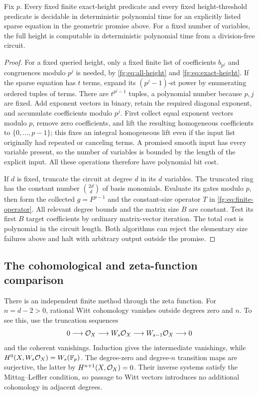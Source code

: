 \begin{corollary}
\label{fg:cor:elementary-p}
Fix $p$. Every fixed finite exact-height predicate and every fixed
height-threshold predicate is decidable in deterministic polynomial time
for an explicitly listed sparse equation in the geometric promise above.
For a fixed number of variables, the full height is computable in
deterministic polynomial time from a division-free circuit.
\end{corollary}
\begin{proof}
For a fixed queried height, only a fixed finite list of coefficients
$b_{p^j}$ and congruences modulo $p^j$ is needed, by
\eqref{fg:eq:all-height} and \eqref{fg:eq:exact-height}. If the sparse
equation has $t$ terms, expand its $(p^j-1)$-st power by enumerating
ordered tuples of terms. There are $t^{p^j-1}$ tuples, a polynomial
number because $p,j$ are fixed. Add exponent vectors in binary, retain
the required diagonal exponent, and accumulate coefficients modulo
$p^j$. First collect equal exponent vectors modulo $p$, remove zero
coefficients, and lift the resulting homogeneous coefficients to
$\{0,\ldots,p-1\}$; this fixes an integral homogeneous lift even if
the input list originally had repeated or canceling terms.
A promised smooth input has every variable present, so the
number of variables is bounded by the length of the explicit input.
All these operations therefore have polynomial bit cost.

If $d$ is fixed, truncate the circuit at degree $d$ in its $d$ variables.
The truncated ring has the constant number $\binom{2d}{d}$ of basis
monomials. Evaluate its gates modulo $p$, then form the collected
$g=F^{p-1}$ and the constant-size operator $T$ in
\eqref{fg:eq:finite-operator}. All relevant degree bounds and the
matrix size $B$ are constant. Test its first $B$ target coefficients
by ordinary matrix-vector iteration. The total cost is polynomial in
the circuit length. Both algorithms can reject the elementary size
failures above and halt with arbitrary output outside the promise.
\end{proof}

\subsection{The cohomological and zeta-function comparison}
There is an independent finite method through the zeta function.
For $n=d-2>0$, rational Witt cohomology vanishes outside degrees zero
and $n$. To see this, use the truncation sequences
\[
 0\longrightarrow\mathcal O_X\longrightarrow W_s\mathcal O_X
   \longrightarrow W_{s-1}\mathcal O_X\longrightarrow0
\]
and the coherent vanishings. Induction gives the intermediate
vanishings, while $H^0(X,W_s\mathcal O_X)=W_s(\mathbb F_p)$.
The degree-zero and degree-$n$ transition maps are surjective, the
latter by $H^{n+1}(X,\mathcal O_X)=0$. Their inverse systems satisfy the
Mittag--Leffler condition, so passage to Witt vectors introduces no
additional cohomology in adjacent degrees.

